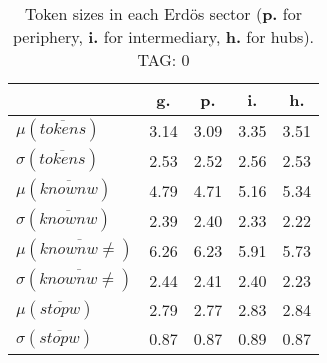\begin{table}[h!]
\begin{center}
\begin{tabular}{| l | c | c | c | c |}\hline
 & g. & p. & i. & h. \\\hline
$\mu(\overline{tokens})$ & 3.14  & 3.09  & 3.35  & 3.51 \\\hline
$\sigma(\overline{tokens})$ & 2.53  & 2.52  & 2.56  & 2.53 \\\hline
$\mu(\overline{knownw})$ & 4.79  & 4.71  & 5.16  & 5.34 \\\hline
$\sigma(\overline{knownw})$ & 2.39  & 2.40  & 2.33  & 2.22 \\\hline
$\mu(\overline{knownw \neq})$ & 6.26  & 6.23  & 5.91  & 5.73 \\\hline
$\sigma(\overline{knownw \neq})$ & 2.44  & 2.41  & 2.40  & 2.23 \\\hline
$\mu(\overline{stopw})$ & 2.79  & 2.77  & 2.83  & 2.84 \\\hline
$\sigma(\overline{stopw})$ & 0.87  & 0.87  & 0.89  & 0.87 \\\hline
\end{tabular}
\caption{Token sizes in each Erd\"os sector ({{\bf p.}} for periphery, {{\bf i.}} for intermediary, {{\bf h.}} for hubs). TAG: 0}
\end{center}
\end{table}